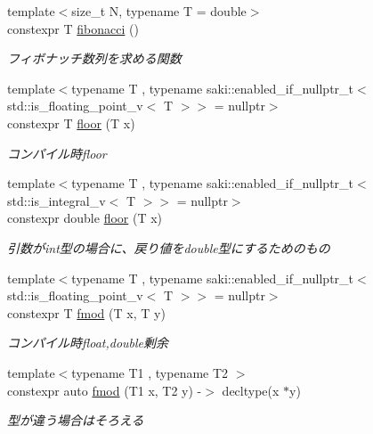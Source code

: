 \begin{DoxyCompactItemize}
{\footnotesize template$<$size\+\_\+t N, typename T  = double$>$ }\\constexpr T \mbox{\hyperlink{namespacesaki_a7bbb434ee3c6d77eeb32b85bb9e316f0}{fibonacci}} ()
\begin{DoxyCompactList}\small\item\em フィボナッチ数列を求める関数 \end{DoxyCompactList}\item 
{\footnotesize template$<$typename T , typename saki\+::enabled\+\_\+if\+\_\+nullptr\+\_\+t$<$ std\+::is\+\_\+floating\+\_\+point\+\_\+v$<$ T $>$$>$  = nullptr$>$ }\\constexpr T \mbox{\hyperlink{namespacesaki_a0718c031975604811084b62bbba93f7f}{floor}} (T x)
\begin{DoxyCompactList}\small\item\em コンパイル時floor \end{DoxyCompactList}\item 
{\footnotesize template$<$typename T , typename saki\+::enabled\+\_\+if\+\_\+nullptr\+\_\+t$<$ std\+::is\+\_\+integral\+\_\+v$<$ T $>$$>$  = nullptr$>$ }\\constexpr double \mbox{\hyperlink{namespacesaki_a327cd6800fef212948644f69cb31d4ff}{floor}} (T x)
\begin{DoxyCompactList}\small\item\em 引数がint型の場合に、戻り値をdouble型にするためのもの \end{DoxyCompactList}\item 
{\footnotesize template$<$typename T , typename saki\+::enabled\+\_\+if\+\_\+nullptr\+\_\+t$<$ std\+::is\+\_\+floating\+\_\+point\+\_\+v$<$ T $>$$>$  = nullptr$>$ }\\constexpr T \mbox{\hyperlink{namespacesaki_a8a7b926b9d370e4a9aed84579675222c}{fmod}} (T x, T y)
\begin{DoxyCompactList}\small\item\em コンパイル時float,double剰余 \end{DoxyCompactList}\item 
{\footnotesize template$<$typename T1 , typename T2 $>$ }\\constexpr auto \mbox{\hyperlink{namespacesaki_ac9d00b62957aebad23850e2f470a8d9c}{fmod}} (T1 x, T2 y) -\/$>$ decltype(x $\ast$y)
\begin{DoxyCompactList}\small\item\em 型が違う場合はそろえる \end{DoxyCompactList}\item 

\end{DoxyCompactItemize}

